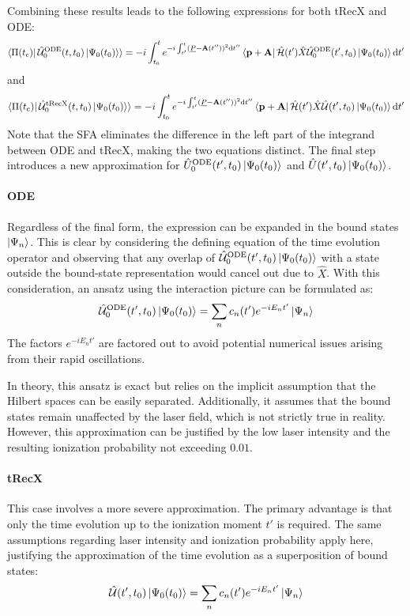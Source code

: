 Combining these results leads to the following expressions for both tRecX and ODE:
\begin{equation}
    \braket{\Pi(t_{\mathrm{c}})|\,\hat{\mathcal{U}}^{\mathrm{ODE}}_0(t,t_0)\ket{\Psi_0(t_0)}} = -i \int_{t_0}^{t} e^{-i \int_{t'}^{t} (\underline{P} - \mathbf{A}(t''))^2 \mathrm{d} t''}\bra{\mathbf{p}+\mathbf{A}}\hat{\mathcal{H}}(t')\hat{X} \hat{\mathcal{U}}^{\mathrm{ODE}}_0(t',t_0)\ket{\Psi_0(t_0)} \mathrm{d} t' \label{eq:smatrixlike1}
\end{equation}
and
\begin{equation}
    \braket{\Pi(t_{\mathrm{c}})|\,\hat{\mathcal{U}}^{\mathrm{tRecX}}_0(t,t_0)\ket{\Psi_0(t_0)}} = -i \int_{t_0}^{t} e^{-i \int_{t'}^{t} (\underline{P} - \mathbf{A}(t''))^2 \mathrm{d} t''}\bra{\mathbf{p}+\mathbf{A}}\hat{\mathcal{H}}(t')\hat{X} \hat{\mathcal{U}}(t',t_0)\ket{\Psi_0(t_0)} \mathrm{d} t' \label{eq:smatrixlike2}
\end{equation}
Note that the SFA eliminates the difference in the left part of the integrand between ODE and tRecX, making the two equations distinct. 
The final step introduces a new approximation for $\hat{U}^{\mathrm{ODE}}_0(t',t_0)\ket{\Psi_0(t_0)}$ and $\hat{U}(t',t_0)\ket{\Psi_0(t_0)}$.

\paragraph{ODE}
Regardless of the final form, the expression can be expanded in the bound states $\ket{\Psi_n}$.
This is clear by considering the defining equation of the time evolution operator and observing that any overlap of $\hat{\mathcal{U}}^{\mathrm{ODE}}_0(t',t_0)\ket{\Psi_0(t_0)}$ with a state outside the bound-state representation would cancel out due to $\hat{X}$.
With this consideration, an ansatz using the interaction picture can be formulated as:
\begin{equation*}
    \hat{\mathcal{U}}^{\mathrm{ODE}}_0(t',t_0)\ket{\Psi_0(t_0)} = \sum_{n}c_n(t')e^{-iE_nt'}\ket{\Psi_n}
\end{equation*}
The factors $e^{-iE_nt'}$ are factored out to avoid potential numerical issues arising from their rapid oscillations.

In theory, this ansatz is exact but relies on the implicit assumption that the Hilbert spaces can be easily separated.
Additionally, it assumes that the bound states remain unaffected by the laser field, which is not strictly true in reality.
However, this approximation can be justified by the low laser intensity and the resulting ionization probability not exceeding $0.01$.

\paragraph{tRecX}
This case involves a more severe approximation.
The primary advantage is that only the time evolution up to the ionization moment $t'$ is required.
The same assumptions regarding laser intensity and ionization probability apply here, justifying the approximation of the time evolution as a superposition of bound states:
\begin{equation*}
    \hat{\mathcal{U}}(t',t_0)\ket{\Psi_0(t_0)} = \sum_{n}c_n(t')e^{-iE_nt'}\ket{\Psi_n}
\end{equation*}


